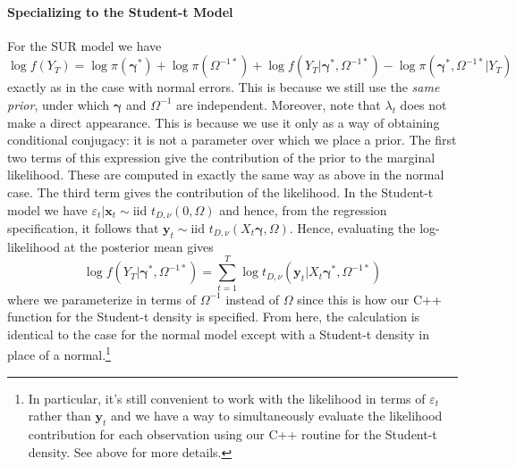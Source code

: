 \documentclass[12pt]{article}
\begin{document}
\paragraph{Specializing to the Student-t Model}
For the SUR model we have
\begin{equation*}
  \log f(Y_T) = \log \pi(\boldsymbol{\gamma}^*) + \log \pi(\Omega^{-1*}) + \log f(Y_T|\boldsymbol{\gamma}^*, \Omega^{-1*}) - \log \pi(\boldsymbol{\gamma}^*, \Omega^{-1*}|Y_T)
\end{equation*}
exactly as in the case with normal errors.
This is because we still use the \emph{same prior}, under which $\boldsymbol{\gamma}$ and $\Omega^{-1}$ are independent.
Moreover, note that $\lambda_t$ does not make a direct appearance.
This is because we use it only as a way of obtaining conditional conjugacy: it is not a parameter over which we place a prior.
The first two terms of this expression give the contribution of the prior to the marginal likelihood.
These are computed in exactly the same way as above in the normal case.
The third term gives the contribution of the likelihood.
In the Student-t model we have $\varepsilon_{t}|\mathbf{x}_t \sim \mbox{iid } t_{D,\nu}(0, \Omega)$ and hence, from the regression specification, it follows that $\mathbf{y}_t \sim \mbox{iid } t_{D,\nu}(X_t \boldsymbol{\gamma},\Omega)$.
Hence, evaluating the log-likelihood at the posterior mean gives
\begin{equation*}
  \log f(Y_T| \boldsymbol{\gamma}^*,\Omega^{-1*}) = \sum_{t=1}^{T} \log{ t_{D,\nu} \left(\mathbf{y}_t|X_t \boldsymbol{\gamma}^*, \Omega^{-1*}\right)}
\end{equation*}
where we parameterize in terms of $\Omega^{-1}$ instead of $\Omega$ since this is how our C++ function for the Student-t density is specified.
From here, the calculation is identical to the case for the normal model except with a Student-t density in place of a normal.\footnote{In particular, it's still convenient to work with the likelihood in terms of $\varepsilon_t$ rather than $\mathbf{y}_t$ and we have a way to simultaneously evaluate the likelihood contribution for each observation using our C++ routine for the Student-t density. See above for more details.}
\end{document}
